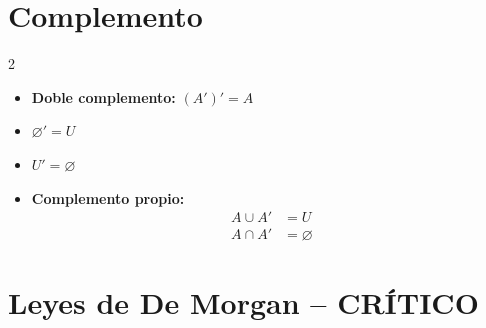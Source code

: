 \documentclass[11pt,a4paper]{article}
\begin{document}
\vspace{1em}

\section{Complemento}

\begin{multicols}{2}
\begin{itemize}[leftmargin=*, itemsep=0.8em]
  \item \textbf{Doble complemento:} $(A')' = A$
  \item $\varnothing' = U$
  \item $U' = \varnothing$
  \item \textbf{Complemento propio:}
    \begin{align*}
      A \cup A' &= U \\
      A \cap A' &= \varnothing
    \end{align*}
\end{itemize}
\end{multicols}

\vspace{1em}

\section{Leyes de De Morgan -- \textcolor{rojo}{CRÍTICO}}

\begin{center}
\end{center}
\end{document}
